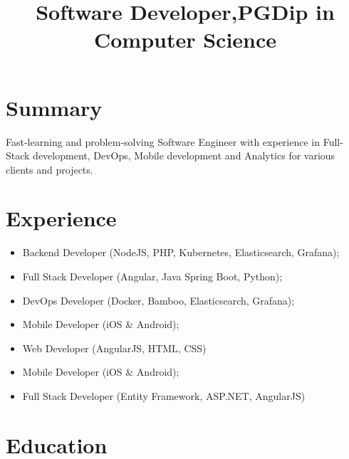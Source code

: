 \documentclass[12pt,a4paper,sans,colorlinks=true, urlcolor=blue]{moderncv}        %
\title{Software Developer,\newline PGDip in Computer Science}                               %
\begin{document}
\makecvtitle

\section{Summary}
Fast-learning and problem-solving Software Engineer with experience in Full-Stack development, DevOps, Mobile development and Analytics for various clients and projects.

\section{Experience}

{\begin{itemize}
		\item Backend Developer (NodeJS, PHP, Kubernetes, Elasticsearch, Grafana);
\end{itemize}}

{\begin{itemize}
		\item Full Stack Developer (Angular, Java Spring Boot, Python);
		\item DevOps Developer (Docker, Bamboo, Elasticsearch, Grafana);
\end{itemize}}

{\begin{itemize}
		\item Mobile Developer (iOS \& Android);
		\item Web Developer (AngularJS, HTML, CSS)
\end{itemize}}

{\begin{itemize}
		\item Mobile Developer (iOS \& Android);
		\item Full Stack Developer (Entity Framework, ASP.NET, AngularJS)
\end{itemize}}

\section{Education}
\end{document}
